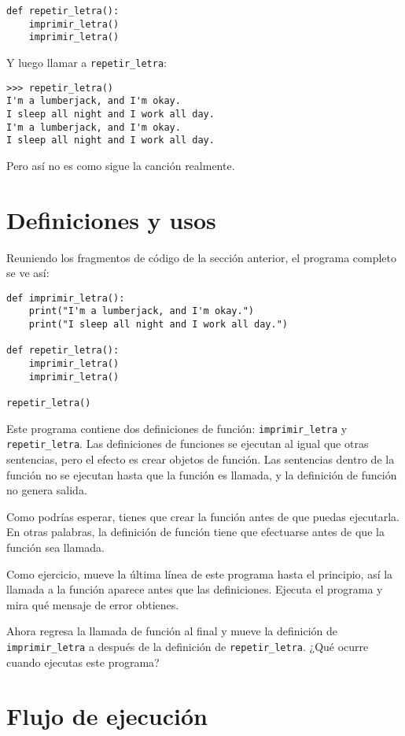 \documentclass[10pt]{book}
\begin{document}
\begin{verbatim}
def repetir_letra():
    imprimir_letra()
    imprimir_letra()
\end{verbatim}
%
Y luego llamar a \verb"repetir_letra":

\begin{verbatim}
>>> repetir_letra()
I'm a lumberjack, and I'm okay.
I sleep all night and I work all day.
I'm a lumberjack, and I'm okay.
I sleep all night and I work all day.
\end{verbatim}
%
Pero así no es como sigue la canción realmente.


\section{Definiciones y usos}

Reuniendo los fragmentos de código de la sección anterior, el
programa completo se ve así:

\begin{verbatim}
def imprimir_letra():
    print("I'm a lumberjack, and I'm okay.")
    print("I sleep all night and I work all day.")

def repetir_letra():
    imprimir_letra()
    imprimir_letra()

repetir_letra()
\end{verbatim}
%
Este programa contiene dos definiciones de función: \verb"imprimir_letra" y
\verb"repetir_letra".  Las definiciones de funciones se ejecutan al igual que otras
sentencias, pero el efecto es crear objetos de función.  Las sentencias
dentro de la función no se ejecutan hasta que la función es llamada, y
la definición de función no genera salida.

Como podrías esperar, tienes que crear la función antes de que puedas
ejecutarla.  En otras palabras, la definición de función tiene que efectuarse
antes de que la función sea llamada.

Como ejercicio, mueve la última línea de este programa
hasta el principio, así la llamada a la función aparece antes que las definiciones. Ejecuta
el programa y mira qué mensaje
de error obtienes.

Ahora regresa la llamada de función al final
y mueve la definición de \verb"imprimir_letra" a después de la definición de
\verb"repetir_letra".  ¿Qué ocurre cuando ejecutas este programa?


\section{Flujo de ejecución}
\end{document}

